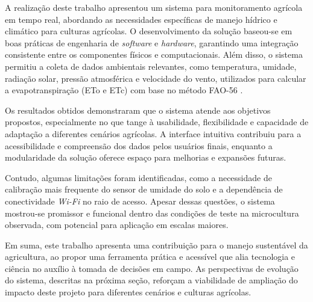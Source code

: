 A realização deste trabalho apresentou um sistema  para monitoramento agrícola em tempo real, abordando as necessidades específicas de manejo hídrico e climático para culturas agrícolas. O desenvolvimento da solução baseou-se em boas práticas de engenharia de \textit{software} e \textit{hardware}, garantindo uma integração consistente entre os componentes físicos e computacionais. Além disso, o sistema permitiu a coleta de dados ambientais relevantes, como temperatura, umidade, radiação solar, pressão atmosférica e velocidade do vento, utilizados para calcular a evapotranspiração (ETo e ETc) com base no método FAO-56 \parencite{Allen_evapotranspiration1998}.

Os resultados obtidos demonstraram que o sistema atende aos objetivos propostos, especialmente no que tange à usabilidade, flexibilidade e capacidade de adaptação a diferentes cenários agrícolas. A interface intuitiva contribuiu para a acessibilidade e compreensão dos dados pelos usuários finais, enquanto a modularidade da solução oferece espaço para melhorias e expansões futuras.

Contudo, algumas limitações foram identificadas, como a necessidade de calibração mais frequente do sensor de umidade do solo e a dependência de conectividade \textit{Wi-Fi} no raio de acesso. Apesar dessas questões, o sistema mostrou-se promissor e funcional dentro das condições de teste na microcultura observada, com potencial para aplicação em escalas maiores.

Em suma, este trabalho apresenta uma contribuição para o manejo sustentável da agricultura, ao propor uma ferramenta prática e acessível que alia tecnologia e ciência no auxílio à tomada de decisões em campo. As perspectivas de evolução do sistema, descritas na próxima seção, reforçam a viabilidade de ampliação do impacto deste projeto para diferentes cenários e culturas agrícolas.